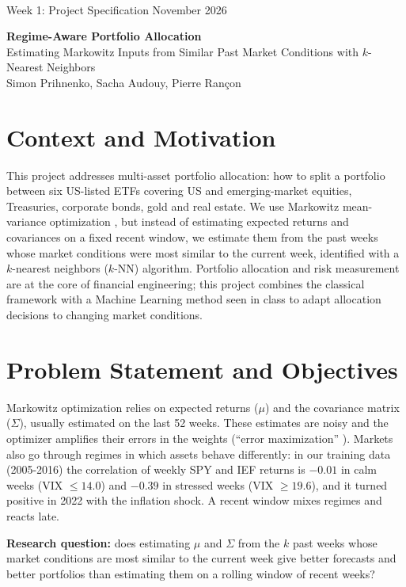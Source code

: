 \documentclass[11pt,a4paper]{article}
\newcommand{\changed}[1]{#1}
\begin{document}
\\
{\small Week 1: Project Specification \hfill November 2026}\par
\vspace{6pt}
\begin{center}
{\Large\bfseries Regime-Aware Portfolio Allocation}\\[2pt]
{\large Estimating Markowitz Inputs from Similar Past Market Conditions with $k$-Nearest Neighbors}\\[6pt]
Simon Prihnenko, Sacha Audouy, Pierre Rançon
\end{center}

\section{Context and Motivation}
This project addresses multi-asset portfolio allocation: how to split a portfolio between six US-listed ETFs
covering US and emerging-market equities, Treasuries, corporate bonds, gold and real estate. We use Markowitz
mean-variance optimization \cite{markowitz}, but instead of estimating expected returns and covariances on a fixed
recent window, we estimate them from the past weeks whose market conditions were most similar to the
current week, identified with a $k$-nearest neighbors ($k$-NN) algorithm.
Portfolio allocation and risk measurement are at the core of financial engineering; this project combines the
classical framework with a Machine Learning method seen in class to adapt allocation decisions to changing
market conditions.

\section{Problem Statement and Objectives}
Markowitz optimization relies on expected returns ($\mu$) and the covariance matrix ($\Sigma$), usually estimated on
the last 52 weeks. These estimates are noisy and the optimizer amplifies their errors in the weights
(``error maximization'' \cite{michaud}). Markets also go through regimes in which assets behave differently: in our
\changed{training data (2005-2016)} the correlation of weekly SPY and IEF returns is \changed{$-0.01$ in calm weeks (VIX $\le 14.0$) and $-0.39$ in
stressed weeks (VIX $\ge 19.6$)}, and it turned positive in 2022 with the inflation shock. A recent window mixes
regimes and reacts late.

\textbf{Research question:} does estimating $\mu$ and $\Sigma$ from the $k$ past weeks whose market conditions are most
similar to the current week give better forecasts and better portfolios than estimating them on \changed{a rolling window of recent weeks}?
\end{document}
